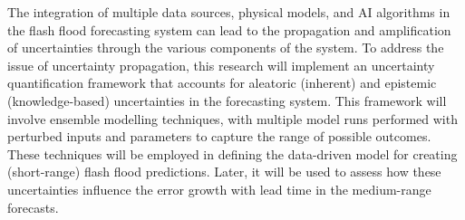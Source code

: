 The integration of multiple data sources, physical models, and AI algorithms in the flash flood forecasting system can lead to the propagation and amplification of uncertainties through the various components of the system. To address the issue of uncertainty propagation, this research will implement an uncertainty quantification framework that accounts for aleatoric (inherent) and epistemic (knowledge-based) uncertainties in the forecasting system. This framework will involve ensemble modelling techniques, with multiple model runs performed with perturbed inputs and parameters to capture the range of possible outcomes. These techniques will be employed in defining the data-driven model for creating (short-range) flash flood predictions. Later, it will be used to assess how these uncertainties influence the error growth with lead time in the medium-range forecasts.
